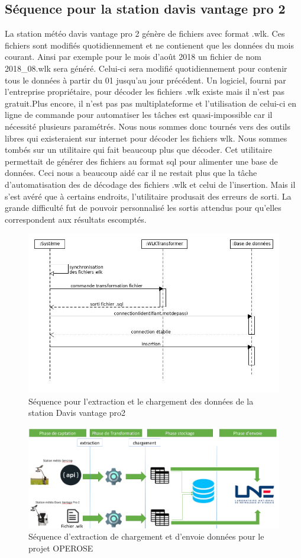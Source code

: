 \subsection{Séquence pour la station davis vantage pro 2} 
La station météo davis vantage pro 2 génère de fichiers avec format .wlk. Ces fichiers sont modifiés quotidiennement et ne contienent que les données du mois courant. Ainsi par exemple pour le mois d’août 2018 un fichier de nom 2018\_08.wlk sera généré. Celui-ci sera modifié quotidiennement pour contenir tous le données à partir du 01 jusqu’au jour précédent. Un logiciel, fourni par l’entreprise propriétaire, pour décoder les fichiers .wlk existe mais il n’est pas gratuit.Plus encore, il n’est pas pas multiplateforme et l’utilisation de celui-ci en ligne de commande pour automatiser les tâches est quasi-impossible car il nécessité plusieurs paramétrés. Nous nous sommes donc tournés vers des outils libres qui existeraient sur internet pour décoder les fichiers wlk. Nous sommes tombés sur un utilitaire qui fait beaucoup plus que décoder. Cet utilitaire permettait de générer des fichiers au format sql pour alimenter une base de données. Ceci nous a beaucoup aidé car il ne restait plus que la tâche d'automatisation des  de décodage des fichiers .wlk et celui de l’insertion. Mais il s’est avéré que à certains endroits, l’utilitaire produsait des erreurs de sorti. La grande difficulté fut de pouvoir personnalisé les sortis attendus pour qu’elles correspondent aux résultats escomptés. 

\begin{figure}
    
    \centering
     \includegraphics[width=.7\textwidth]{images/davis_senquence_diagrame.jpg}
     \caption{ Séquence pour l'extraction et le chargement des données de la station Davis vantage pro2}
     \label{diagramme de séquence station sencrop}
\end{figure}


\begin{figure}[!h]
    \centering
     \includegraphics[width=1\textwidth]{images/processusOperose.png}
     \caption{ Séquence d'extraction de chargement et d'envoie données pour le projet OPEROSE}
     \label{diagremme de séquence station Davis}
\end{figure}
     

